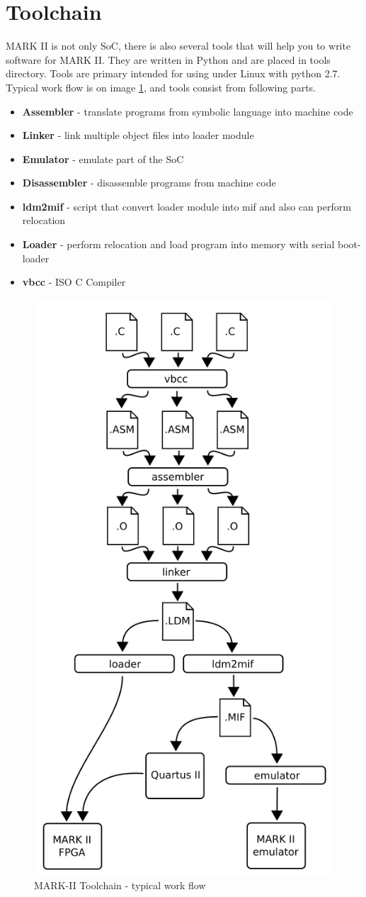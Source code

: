 \section{Toolchain}

MARK II is not only SoC, there is also several tools that will help you to
write software for MARK II. They are written in Python and are placed in tools
directory. Tools are primary intended for using under Linux with python 2.7.
Typical work flow is on image \ref{fig:toolchain_workflow}, and tools consist
from following parts.

\begin{itemize}
    \item \textbf{Assembler} - translate programs from symbolic language into machine code
    \item \textbf{Linker} - link multiple object files into loader module
    \item \textbf{Emulator} - emulate part of the SoC
    \item \textbf{Disassembler} - disassemble programs from machine code
    \item \textbf{ldm2mif} - script that convert loader module into mif and also can perform relocation
    \item \textbf{Loader} - perform relocation and load program into memory with serial boot-loader
    \item \textbf{vbcc} - ISO C Compiler
\end{itemize}

\begin{figure}[]
    \centering
    \includegraphics[width=.7\textwidth]{img/toolworkflow.png}
    \caption{MARK-II Toolchain - typical work flow}
    \label{fig:toolchain_workflow}
\end{figure}
